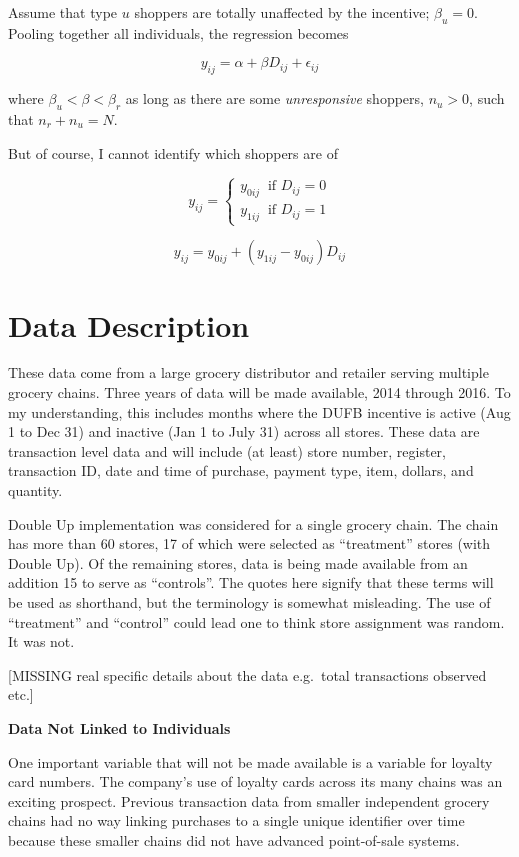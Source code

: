 \documentclass[12pt,letterpaperpaper,]{book}
\begin{document}
Assume that type \(u\) shoppers are totally unaffected by the incentive;
\(\beta_u = 0\). Pooling together all individuals, the regression
becomes

\[y_{ij} = \alpha + \beta D_{ij} + \epsilon_{ij}\]

where \(\beta_u < \beta < \beta_r\) as long as there are some
\emph{unresponsive} shoppers, \(n_{u} > 0\), such that
\(n_{r} + n_{u} = N\).

But of course, I cannot identify which shoppers are of

\[
y_{ij} = 
\begin{cases}
  y_{0ij}~\text{ if }D_{ij} = 0 \\
  y_{1ij}~\text{ if }D_{ij} = 1
\end{cases}
\]

\[y_{ij} = y_{0ij} + (y_{1ij} - y_{0ij})D_{ij}\]

\section*{Data Description}\label{data-1}

These data come from a large grocery distributor and retailer serving
multiple grocery chains. Three years of data will be made available,
2014 through 2016. To my understanding, this includes months where the
DUFB incentive is active (Aug 1 to Dec 31) and inactive (Jan 1 to July
31) across all stores. These data are transaction level data and will
include (at least) store number, register, transaction ID, date and time
of purchase, payment type, item, dollars, and quantity.

Double Up implementation was considered for a single grocery chain. The
chain has more than 60 stores, 17 of which were selected as
``treatment'' stores (with Double Up). Of the remaining stores, data is
being made available from an addition 15 to serve as ``controls''. The
quotes here signify that these terms will be used as shorthand, but the
terminology is somewhat misleading. The use of ``treatment'' and
``control'' could lead one to think store assignment was random. It was
not.

{[}MISSING real specific details about the data e.g.~total transactions
observed etc.{]}

\textbf{Data Not Linked to Individuals}

One important variable that will not be made available is a variable for
loyalty card numbers. The company's use of loyalty cards across its many
chains was an exciting prospect. Previous transaction data from smaller
independent grocery chains had no way linking purchases to a single
unique identifier over time because these smaller chains did not have
advanced point-of-sale systems.
\end{document}
